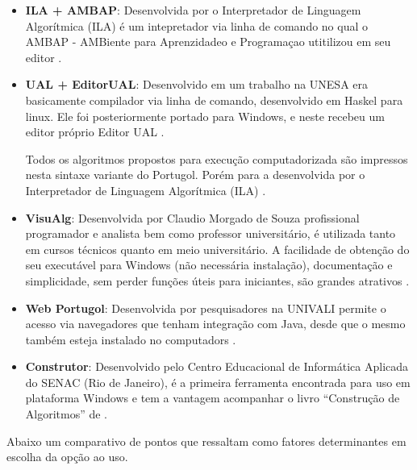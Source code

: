 \begin{itemize}

\item \textbf{ILA + AMBAP}: Desenvolvida por  o Interpretador de Linguagem Algorítmica (ILA) é um intepretador via linha de comando no qual o AMBAP - AMBiente para Aprenzidadeo e Programaçao utitilizou em seu editor \cite{citar}.

\item \textbf{UAL + EditorUAL}: Desenvolvido em um trabalho na UNESA era basicamente compilador via linha de comando, desenvolvido em Haskel para linux. Ele foi posteriormente portado para Windows, e neste recebeu um editor próprio Editor UAL \cite{citar}.

Todos os algoritmos propostos para execução computadorizada são impressos nesta sintaxe variante do Portugol. Porém para a desenvolvida por  o Interpretador de Linguagem Algorítmica (ILA) \cite{citar}.

\item \textbf{VisuAlg}: Desenvolvida por Claudio Morgado de Souza profissional programador e analista bem como professor universitário, é utilizada tanto em cursos técnicos quanto em meio universitário. A facilidade de obtenção do seu executável para Windows (não necessária instalação), documentação e simplicidade, sem perder funções úteis para iniciantes, são grandes atrativos \cite{souza2013etal}.

\item \textbf{Web Portugol}: Desenvolvida por pesquisadores na UNIVALI permite o acesso via navegadores que tenham integração com Java, desde que o mesmo também esteja instalado no computadors \cite{souza2013etal}.

\item \textbf{Construtor}: Desenvolvido pelo Centro Educacional de Informática Aplicada do SENAC (Rio de Janeiro), é a primeira ferramenta encontrada para uso em plataforma Windows e tem a vantagem acompanhar o livro ``Construção de Algoritmos'' de .

\end{itemize}

Abaixo um comparativo de pontos que ressaltam como fatores determinantes em escolha da opção ao uso.

